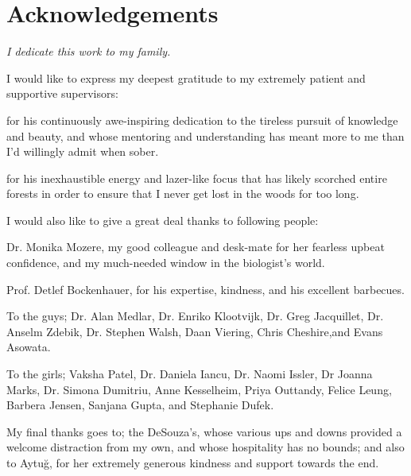 \chapter*{Acknowledgements}
\vfill
\textit{\large I dedicate this work to my family.}

\vfill

\noindent
I would like to express my deepest gratitude to my extremely patient and supportive supervisors:
\vspace{-5pt}
\begin{description}[labelsep=0.5em, align=left, labelwidth=0em, labelindent=1em, leftmargin=0em]
\item[\bf Dr. Horia Stanescu]{for his continuously awe-inspiring dedication to the tireless pursuit of knowledge and beauty, and whose mentoring and understanding has meant more to me than I'd willingly admit when sober.}
\item[\bf Prof. Robert Kleta]{for his inexhaustible energy and lazer-like focus that has likely scorched entire forests in order to ensure that I never get lost in the woods for too long.}
\end{description}

\vfill
\begin{spacing}{1.3}
\noindent
I would also like to give a great deal thanks to following people:
\vspace{-8pt}
\begin{description}[labelsep=0.5em, align=left, labelwidth=0em, labelindent=1em, leftmargin=0em]
\item{Dr. Monika Mozere, my good colleague and desk-mate for her fearless upbeat confidence, and my much-needed window in the biologist's world.}
\item{Prof. Detlef Bockenhauer, for his expertise, kindness, and his excellent barbecues.}
\item{To the guys; Dr. Alan Medlar, Dr. Enriko Klootvijk, Dr. Greg Jacquillet, Dr. Anselm Zdebik, Dr. Stephen Walsh, Daan Viering, Chris Cheshire,and Evans Asowata.}
\item{To the girls; Vaksha Patel, Dr. Daniela Iancu, Dr. Naomi Issler, Dr Joanna Marks, Dr. Simona Dumitriu, Anne Kesselheim, Priya Outtandy, Felice Leung, Barbera Jensen, Sanjana Gupta, and Stephanie Dufek.}
\end{description}
\end{spacing}

\vfill
\noindent
My final thanks goes to; the DeSouza's, whose various ups and downs provided a welcome distraction from my own, and whose hospitality has no bounds; and also to Aytu\u{g}, for her extremely generous kindness and support towards the end.